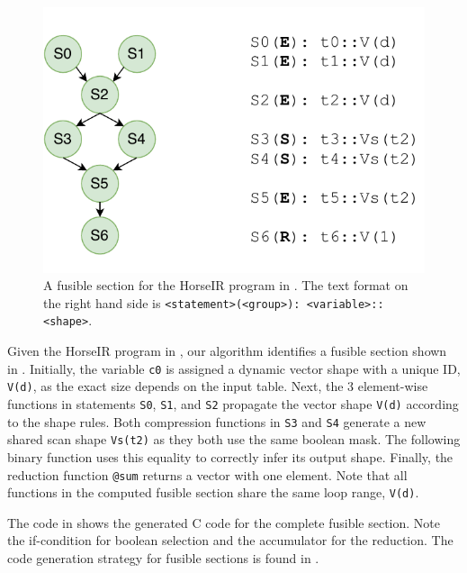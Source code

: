 \begin{figure}[htbp]
\centering
\includegraphics[width=.7\columnwidth]{./src/figure/graph-example.pdf}
\caption{A fusible section for the HorseIR program in . The
text format on the right hand side is \texttt{<statement>(<group>): <variable>::<shape>}.}
\label{fig:fusion_example}
\end{figure}

Given the HorseIR program in , our algorithm identifies a
fusible section shown in . Initially, the variable \texttt{c0}
is assigned a dynamic vector shape with a unique ID, \texttt{V(d)}, as the exact size depends
on the input table. Next, the 3 element-wise functions in statements \texttt{S0},
\texttt{S1}, and \texttt{S2} propagate the vector shape \texttt{V(d)} according to the shape rules.
Both compression functions in \texttt{S3} and \texttt{S4} generate a new shared scan shape
\texttt{Vs(t2)} as they both use the same boolean mask. The following binary function
uses this equality to correctly infer its output shape. Finally, the reduction function
\texttt{@sum} returns a vector with one element. Note that all functions in the computed
fusible section share the same loop range, \texttt{V(d)}.

The code in  shows the generated C code for the complete
fusible section. Note the if-condition for boolean selection
and the accumulator for the reduction. The code generation strategy for fusible
sections is found in .


